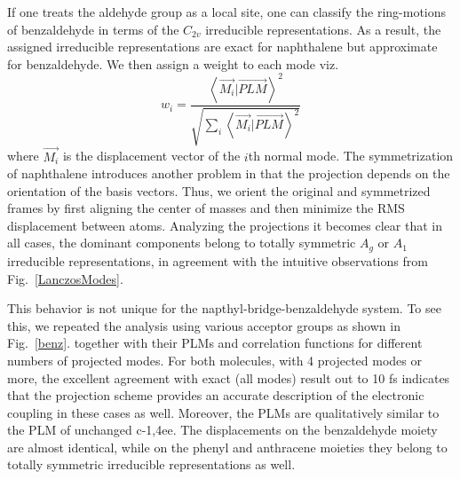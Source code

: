 If one treats the aldehyde group as a local site, one can classify the ring-motions of
benzaldehyde in terms of the $C_{2v}$ irreducible representations.
As a result, the assigned irreducible representations are exact for naphthalene but approximate for benzaldehyde.
We then assign a weight to each mode viz.
$$
w_i = \frac{\left\langle \overrightarrow{M_{i}}|\overrightarrow{PLM}\right\rangle ^{2}}{\sqrt{\sum_{i}\left\langle \overrightarrow{M_{i}}|\overrightarrow{PLM}\right\rangle ^{2}}}
$$
where $\overrightarrow{M_{i}}$ is the displacement vector of the $i$th normal mode.
The symmetrization of naphthalene introduces another problem
in that the projection depends on the orientation of the basis vectors.
Thus, we orient the original and symmetrized frames by first aligning the center of masses
and then minimize the RMS displacement between atoms.
Analyzing the projections it becomes clear that in all cases, the dominant components
belong to totally symmetric $A_{g}$ or $A_1$ irreducible representations,  in agreement
with the intuitive observations from Fig.~\ref{LanczosModes}.

This behavior is not unique for the napthyl-bridge-benzaldehyde  system.
To see this, we repeated the analysis using various acceptor groups as shown in Fig.~\ref{benz}.
together with their PLMs and correlation functions for different numbers of projected modes.
For both molecules,  with 4 projected modes or more, the excellent agreement with exact (all modes) result out to 10 fs indicates that
the projection scheme provides an accurate description of the electronic coupling in  these cases as well.
Moreover, the PLMs are qualitatively similar to the PLM of unchanged c-1,4ee.
The displacements on the benzaldehyde moiety are almost identical, while on the phenyl and anthracene moieties they belong to totally symmetric irreducible representations as well.

%


